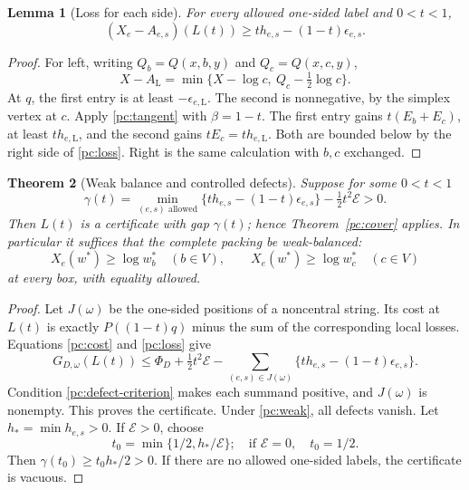 \documentclass[11pt]{article}
\numberwithin{equation}{section}
\newtheorem{theorem}{Theorem}[section]
\newtheorem{lemma}[theorem]{Lemma}
\theoremstyle{definition}\newtheorem{definition}[theorem]{Definition}
\theoremstyle{remark}\newtheorem{remark}[theorem]{Remark}
\newcommand{\Lft}{\mathrm L}
\begin{document}
\begin{lemma}[Loss for each side]\label{pc:side-loss}
For every allowed one-sided label and \(0<t<1\),
\begin{equation}\label{pc:loss}
 (X_e-A_{e,s})(L(t))
       \ge t h_{e,s}-(1-t)\epsilon_{e,s}.
\end{equation}
\end{lemma}
\begin{proof}
For left, writing \(Q_b=Q(x,b,y)\) and \(Q_c=Q(x,c,y)\),
\[
 X-A_\Lft=\min\{X-\log c,\ Q_c-\tfrac12\log c\}.
 \]
At \(q\), the first entry is at least \(-\epsilon_{e,\Lft}\).
The second is nonnegative, by the simplex vertex at \(c\).
Apply \eqref{pc:tangent} with \(\beta=1-t\). The first entry
gains \(t(E_b+E_c)\), at least \(t h_{e,\Lft}\), and the
second gains \(tE_c=t h_{e,\Lft}\). Both are bounded below
by the right side of \eqref{pc:loss}. Right is the same calculation
with \(b,c\) exchanged.
\end{proof}

\begin{theorem}[Weak balance and controlled defects]\label{pc:weak-balance}
Suppose for some \(0<t<1\)
\begin{equation}\label{pc:defect-criterion}
 \gamma(t)=
 \min_{(e,s)\text{ allowed}}
       \{t h_{e,s}-(1-t)\epsilon_{e,s}\}
                       -\tfrac12t^2\mathcal E>0.
\end{equation}
Then \(L(t)\) is a certificate with gap \(\gamma(t)\);
hence Theorem~\ref{pc:cover} applies. In particular it suffices that
the complete packing be \emph{weak-balanced}:
\begin{equation}\label{pc:weak}
 X_e(w^*)\ge\log w_b^*\quad(b\in V),\qquad
 X_e(w^*)\ge\log w_c^*\quad(c\in V)
\end{equation}
at every box, with equality allowed.
\end{theorem}
\begin{proof}
Let \(J(\omega)\) be the one-sided positions of a noncentral string.
Its cost at \(L(t)\) is exactly \(P((1-t)q)\) minus the sum of
the corresponding local losses. Equations \eqref{pc:cost} and
\eqref{pc:loss} give
\[
 G_{D,\omega}(L(t))\le
 \Phi_D+\tfrac12t^2\mathcal E-
       \sum_{(e,s)\in J(\omega)}
                 \{t h_{e,s}-(1-t)\epsilon_{e,s}\}.
\]
Condition \eqref{pc:defect-criterion} makes each summand positive,
and \(J(\omega)\) is nonempty. This proves the certificate.
Under \eqref{pc:weak}, all defects vanish. Let \(h_*=\min h_{e,s}>0\).
If \(\mathcal E>0\), choose
\[
 t_0=\min\{1/2,h_*/\mathcal E\};
 \quad\text{if }\mathcal E=0,\quad t_0=1/2.
\]
Then \(\gamma(t_0)\ge t_0h_*/2>0\). If there are no allowed
one-sided labels, the certificate is vacuous.
\end{proof}
\end{document}
